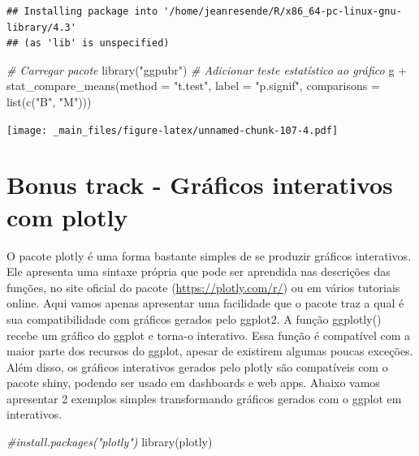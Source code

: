 \documentclass[
]{book}
\newenvironment{Shaded}{\begin{snugshade}}{\end{snugshade}}
\newcommand{\AttributeTok}[1]{\textcolor[rgb]{0.77,0.63,0.00}{#1}}
\newcommand{\CommentTok}[1]{\textcolor[rgb]{0.56,0.35,0.01}{\textit{#1}}}
\newcommand{\FunctionTok}[1]{\textcolor[rgb]{0.00,0.00,0.00}{#1}}
\newcommand{\NormalTok}[1]{#1}
\newcommand{\SpecialCharTok}[1]{\textcolor[rgb]{0.00,0.00,0.00}{#1}}
\newcommand{\StringTok}[1]{\textcolor[rgb]{0.31,0.60,0.02}{#1}}
\begin{document}
\begin{verbatim}
## Installing package into '/home/jeanresende/R/x86_64-pc-linux-gnu-library/4.3'
## (as 'lib' is unspecified)
\end{verbatim}

\begin{Shaded}
\begin{Highlighting}[]
\CommentTok{\# Carregar pacote}
\FunctionTok{library}\NormalTok{(}\StringTok{"ggpubr"}\NormalTok{)}
\CommentTok{\# Adicionar teste estatístico ao gráfico}
\NormalTok{g }\SpecialCharTok{+}
\FunctionTok{stat\_compare\_means}\NormalTok{(}\AttributeTok{method =} \StringTok{"t.test"}\NormalTok{, }\AttributeTok{label =} \StringTok{"p.signif"}\NormalTok{,}
\AttributeTok{comparisons =} \FunctionTok{list}\NormalTok{(}\FunctionTok{c}\NormalTok{(}\StringTok{"B"}\NormalTok{, }\StringTok{"M"}\NormalTok{)))}
\end{Highlighting}
\end{Shaded}

\texttt{[image: \_main\_files/figure-latex/unnamed-chunk-107-4.pdf]}

\hypertarget{bonus-track---gruxe1ficos-interativos-com-plotly}{%
\section{Bonus track - Gráficos interativos com plotly}\label{bonus-track---gruxe1ficos-interativos-com-plotly}}

O pacote plotly é uma forma bastante simples de se produzir gráficos interativos. Ele apresenta uma sintaxe própria que pode ser aprendida nas descrições das funções, no site oficial do pacote (\url{https://plotly.com/r/}) ou em vários tutoriais online. Aqui vamos apenas apresentar uma facilidade que o pacote traz a qual é sua compatibilidade com gráficos gerados pelo ggplot2. A função ggplotly() recebe um gráfico do ggplot e torna-o interativo. Essa função é compatível com a maior parte dos recursos do ggplot, apesar de existirem algumas poucas exceções. Além disso, os gráficos interativos gerados pelo plotly são compatíveis com o pacote shiny, podendo ser usado em dashboards e web apps. Abaixo vamos apresentar 2 exemplos simples transformando gráficos gerados com o ggplot em interativos.

\begin{Shaded}
\begin{Highlighting}[]
\CommentTok{\#install.packages("plotly")}
\FunctionTok{library}\NormalTok{(plotly)}
\end{Highlighting}
\end{Shaded}
\end{document}
